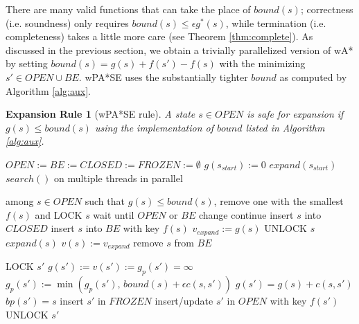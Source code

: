 \documentclass[letterpaper]{article}
\newtheorem{rul}{Expansion Rule}
\begin{document}
There are many valid functions that can take the place of $bound(s)$; correctness (i.e. soundness) only requires $bound(s) \le \epsilon g^*(s)$, while termination (i.e. completeness) takes a little more care (see Theorem \ref{thm:complete}). As discussed in the previous section, we obtain a trivially parallelized version of wA* by setting $bound(s) = g(s) + f(s') - f(s)$ with the minimizing $s'\in OPEN \cup BE$. wPA*SE uses the substantially tighter $bound$ as computed by Algorithm \ref{alg:aux}.

\begin{rul}[wPA*SE rule]
A state $s\in OPEN$ is safe for expansion if $g(s) \le bound(s)$ using the implementation of $bound$ listed in Algorithm \ref{alg:aux}.
\end{rul}

\begin{algorithm}
\caption{$main()$}
\label{alg:main}
\begin{algorithmic}
\STATE $OPEN := BE := CLOSED := FROZEN := \emptyset$
\STATE $g(s_{start}) := 0$
\STATE $expand(s_{start})$
\STATE $search()$ on multiple threads in parallel
\end{algorithmic}
\end{algorithm}

\begin{algorithm}
\caption{$search()$}
\label{alg:search}
\begin{algorithmic}
\STATE among $s\in OPEN$ such that $g(s) \le bound(s)$, remove one with the smallest $f(s)$ and LOCK $s$
\STATE wait until $OPEN$ or $BE$ change
\STATE continue
\ENDIF
\STATE insert $s$ into $CLOSED$
\STATE insert $s$ into $BE$ with key $f(s)$
\STATE $v_{expand} := g(s)$
\STATE UNLOCK $s$
\STATE $expand(s)$
\STATE $v(s) := v_{expand}$
\STATE remove $s$ from $BE$
\ENDWHILE
\end{algorithmic}
\end{algorithm}

\begin{algorithm}
\caption{$expand(s)$}
\label{alg:expand}
\begin{algorithmic}
\STATE LOCK $s'$
\STATE $g(s') := v(s') := g_p(s') = \infty$
\ENDIF
\STATE $g_p(s') := \min(g_p(s'),\,bound(s) + \epsilon c(s,s'))$
\STATE $g(s') = g(s) + c(s,s')$
\STATE $bp(s') = s$
\STATE insert $s'$ in $FROZEN$
\ELSE
\STATE insert/update $s'$ in $OPEN$ with key $f(s')$
\ENDIF
\ENDIF
\STATE UNLOCK $s'$
\ENDFOR
\end{algorithmic}
\end{algorithm}
\end{document}
